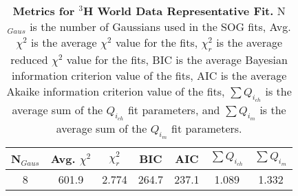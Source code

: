 
\begin{table}[!h]
\centering
\begin{tabular}{|c c c c c c c|}
\hline
\textbf{N$_{Gaus}$} & \textbf{Avg. $\chi^2$} & \textbf{$\chi^2_r$} & \textbf{BIC} & \textbf{AIC} & \textbf{$\sum Q_{i_{ch}}$} & \textbf{$\sum Q_{i_{m}}$}\\
\hline
8 & 601.9 & 2.774 & 264.7 & 237.1 & 1.089 & 1.332\\
\hline
\end{tabular}
\caption[Metrics for $^3$H World Data Representative Fit]{{\bf{Metrics for $^3$H World Data Representative Fit.}} N$_{Gaus}$ is the number of Gaussians used in the SOG fits, Avg. $\chi^2$ is the average $\chi^2$ value for the fits, $\chi^2_r$ is the average reduced $\chi^2$ value for the fits, BIC is the average Bayesian information criterion value of the fits, AIC is the average Akaike information criterion value of the fits, $\sum Q_{i_{ch}}$ is the average sum of the $Q_{i_{ch}}$ fit parameters, and $\sum Q_{i_{m}}$ is the average sum of the $Q_{i_{m}}$ fit parameters.}
\label{tab:3h_rep_fit_stats}
\end{table}

